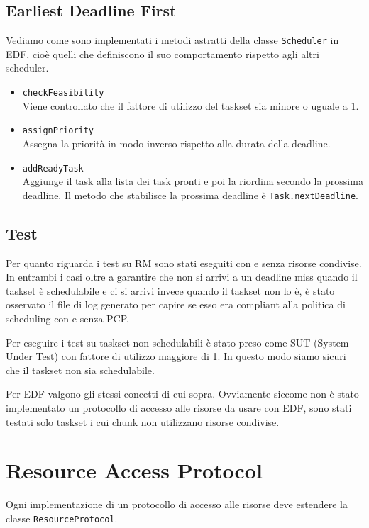 \subsection{Earliest Deadline First}
Vediamo come sono implementati i metodi astratti della classe \texttt{Scheduler} in EDF, cioè quelli che definiscono il suo comportamento rispetto agli altri scheduler.
\begin{itemize}
    \item \texttt{checkFeasibility} \\
        Viene controllato che il fattore di utilizzo del taskset sia minore o uguale a 1.
    \item \texttt{assignPriority} \\
        Assegna la priorità in modo inverso rispetto alla durata della deadline.
    \item \texttt{addReadyTask} \\
        Aggiunge il task alla lista dei task pronti e poi la riordina secondo la prossima deadline. Il metodo che stabilisce la prossima deadline è \texttt{Task.nextDeadline}.
\end{itemize}

\subsection{Test}
Per quanto riguarda i test su RM sono stati eseguiti con e senza risorse condivise. In entrambi i casi oltre a garantire che non si arrivi a un deadline miss quando il taskset è schedulabile e ci si arrivi invece quando il taskset non lo è, è stato osservato il file di log generato per capire se esso era compliant alla politica di scheduling con e senza PCP.

Per eseguire i test su taskset non schedulabili è stato preso come SUT (System Under Test) con fattore di utilizzo maggiore di 1. In questo modo siamo sicuri che il taskset non sia schedulabile.

\myskip

Per EDF valgono gli stessi concetti di cui sopra. Ovviamente siccome non è stato implementato un protocollo di accesso alle risorse da usare con EDF, sono stati testati solo taskset i cui chunk non utilizzano risorse condivise.

\section{Resource Access Protocol}
\label{sec:resaccprot}
Ogni implementazione di un protocollo di accesso alle risorse deve estendere la classe \texttt{ResourceProtocol}.

